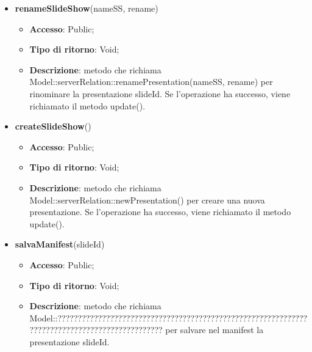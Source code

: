 {{\begin{itemize}
\begin{itemize}
		\end{itemize}
		\item \textbf{renameSlideShow}(nameSS, rename)
		\begin{itemize}
			\item \textbf{Accesso}: Public;
			\item \textbf{Tipo di ritorno}: Void;
			\item \textbf{Descrizione}: metodo che richiama Model::\-serverRelation::\-renamePresentation(nameSS, rename) per rinominare la presentazione slideId. Se l'operazione ha successo, viene richiamato il metodo update().
		\end{itemize}
		\item \textbf{createSlideShow}()
		\begin{itemize}
			\item \textbf{Accesso}: Public;
			\item \textbf{Tipo di ritorno}: Void;
			\item \textbf{Descrizione}: metodo che richiama Model::\-serverRelation::\-newPresentation() per creare una nuova presentazione. Se l'operazione ha successo, viene richiamato il metodo update().
		\end{itemize}
		\item \textbf{salvaManifest}(slideId)
		\begin{itemize}
			\item \textbf{Accesso}: Public;
			\item \textbf{Tipo di ritorno}: Void;
			\item \textbf{Descrizione}: metodo che richiama Model::\-??????????????????????????????????????????????????????????????????????????????????????????????? per salvare nel manifest la presentazione slideId.
		\end{itemize}
	\end{itemize}
	}
}
